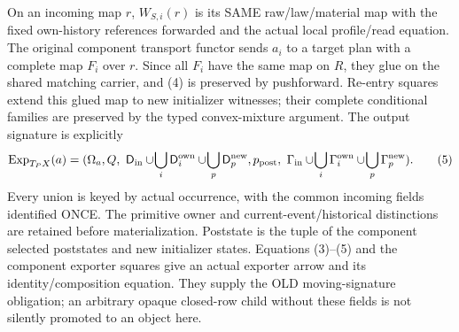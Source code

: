\documentclass[11pt]{article}
\begin{document}
On an incoming map $r$, $W_{S,i}(r)$ is its SAME raw/law/material map with the fixed own-history references forwarded and the actual local profile/read equation. The original component transport functor sends $a_i$ to a target plan with a complete map $F_i$ over $r$. Since all $F_i$ have the same map on $R$, they glue on the shared matching carrier, and (4) is preserved by pushforward. Re-entry squares extend this glued map to new initializer witnesses; their complete conditional families are preserved by the typed convex-mixture argument. The output signature is explicitly
\[
 \operatorname{Exp}_{T_PX}(a)=
 (\Omega_a,Q,\ \mathsf D_{\rm in}\cup\!\bigcup_i\mathsf D_i^{\rm own}
                       \cup\!\bigcup_p\mathsf D_p^{\rm new},
   p_{\rm post},\ \Gamma_{\rm in}\cup\!\bigcup_i\Gamma_i^{\rm own}
                       \cup\!\bigcup_p\Gamma_p^{\rm new}).     \tag{5}
\]
Every union is keyed by actual occurrence, with the common incoming fields identified ONCE. The primitive owner and current-event/historical distinctions are retained before materialization. Poststate is the tuple of the component selected poststates and new initializer states. Equations (3)--(5) and the component exporter squares give an actual exporter arrow and its identity/composition equation. They supply the OLD moving-signature obligation; an arbitrary opaque closed-row child without these fields is not silently promoted to an object here.
\end{document}
